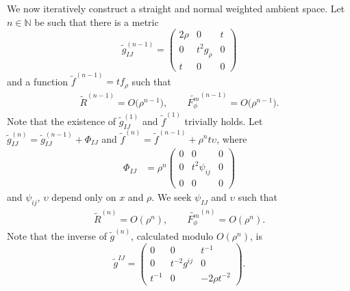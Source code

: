 \documentclass[11pt]{article}
\numberwithin{equation}{section}
\newcommand{\cg}{\widetilde{g}}
\numberwithin{equation}{section}
\begin{document}
We now iteratively construct a straight and normal weighted ambient space.
Let $n\in\mathbb{N}$ be such that there is a metric
\[
\widetilde{g}_{IJ}^{(n-1)} = \begin{pmatrix}
2\rho & 0 & t \\
0 & t^2 g_{\rho} & 0 \\
t & 0 & 0
\end{pmatrix}
\]
and a function $\widetilde{f}^{(n-1)}=tf_\rho$ such that
\begin{gather*}
\widetilde{R}^{(n-1)}=O\big(\rho^{n-1}\big),
\qquad
\widetilde{F_{\phi}^m}^{(n-1)}=O\big(\rho^{n-1}\big).
\end{gather*}
Note that the existence of $\widetilde{g}_{IJ}^{(1)}$ and $\widetilde{f}^{(1)}$ trivially holds. Let $\cg^{(n)}_{IJ}=\cg^{(n-1)}_{IJ}+\Phi_{IJ}$ and $\widetilde{f}^{(n)}= \widetilde{f}^{(n-1)}+\rho^{n}t\upsilon$, where
\begin{align*}
\Phi_{IJ}&= \rho^n \begin{pmatrix}
0 & 0 & 0 \\
0 & t^2\psi_{ij} & 0 \\
0 & 0 & 0
\end{pmatrix}
\end{align*}
and $\psi_{ij}$, $\upsilon$ depend only on $x$ and $\rho$.
We seek $\psi_{IJ}$ and $\upsilon$ such that
 \begin{gather*}
\widetilde{R}^{(n)}= O(\rho^{n}),
\qquad
\widetilde{F_{\phi}^m}^{(n)} = O(\rho^{n}).
\end{gather*}
Note that the inverse of $\cg^{(n)}$, calculated modulo $O(\rho^n)$, is
\[
\cg^{IJ} = \begin{pmatrix} 0 & 0 & t^{-1}\\ 0 & t^{-2}g^{ij}& 0\\ t^{-1} & 0 & -{2\rho}t^{-2}\end{pmatrix}\!.
\]
\end{document}
